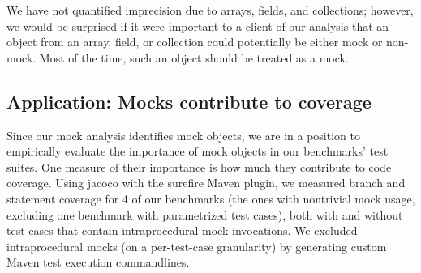 We have not quantified imprecision due to arrays, fields, and collections; however, we would be surprised if it were important to a client of our analysis that an object from an array, field, or collection could potentially be either mock or non-mock. Most of the time, such an object should be treated as a mock.


%
%

\subsection{Application: Mocks contribute to coverage}\label{sec:coverage} Since our mock analysis identifies mock objects, we are in a position to empirically evaluate the importance of mock objects in our benchmarks' test suites. One measure of their importance is how much they contribute to code coverage. Using jacoco with the surefire Maven plugin, we measured branch and statement coverage for 4 of our benchmarks (the ones with nontrivial mock usage, excluding one benchmark with parametrized test cases), both with and without test cases that contain intraprocedural mock invocations. We excluded intraprocedural mocks (on a per-test-case granularity) by generating custom Maven test execution commandlines.


